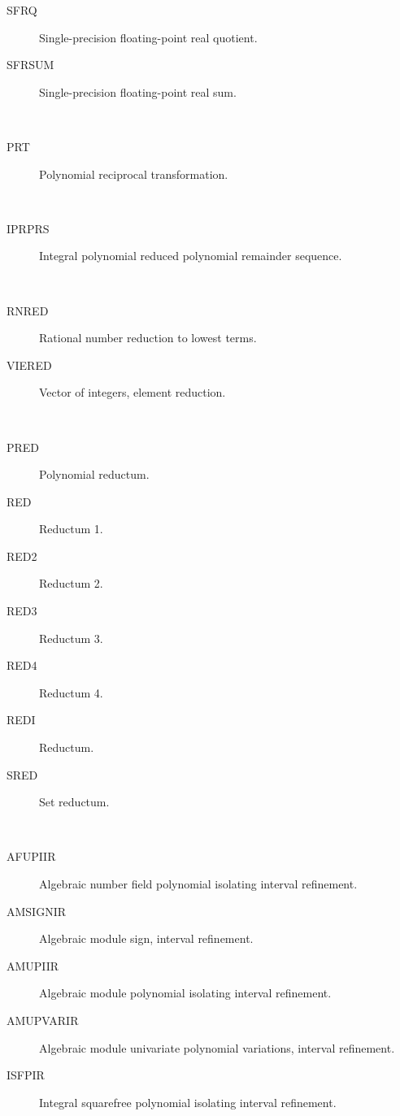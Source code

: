 \begin{description}
\begin{description}
  \item[SFRQ]  Single-precision floating-point real quotient.
  \item[SFRSUM]  Single-precision floating-point real sum.
  \end{description}
\item[reciprocal] \ \ 
  \begin{description}
  \item[PRT]  Polynomial reciprocal transformation.
  \end{description}
\item[reduced] \ \ 
  \begin{description}
  \item[IPRPRS]  Integral polynomial reduced polynomial remainder sequence.
  \end{description}
\item[reduction] \ \ 
  \begin{description}
  \item[RNRED]  Rational number reduction to lowest terms.
  \item[VIERED]  Vector of integers, element reduction.
  \end{description}
\item[reductum] \ \ 
  \begin{description}
  \item[PRED]  Polynomial reductum.
  \item[RED]  Reductum 1.
  \item[RED2]  Reductum 2.
  \item[RED3]  Reductum 3.
  \item[RED4]  Reductum 4.
  \item[REDI]  Reductum.
  \item[SRED]  Set reductum.
  \end{description}
\item[refinement] \ \ 
  \begin{description}
  \item[AFUPIIR]  Algebraic number field polynomial isolating interval
    refinement.
  \item[AMSIGNIR]  Algebraic module sign, interval refinement.
  \item[AMUPIIR]  Algebraic module polynomial isolating interval refinement.
  \item[AMUPVARIR]  Algebraic module univariate polynomial variations,
    interval refinement.
  \item[ISFPIR]  Integral squarefree polynomial isolating interval refinement.

\end{description}
\end{description}
